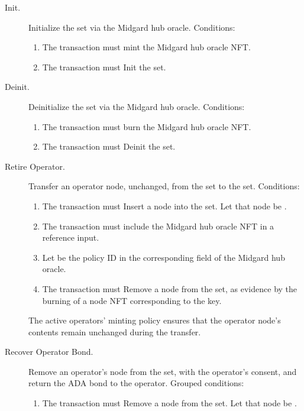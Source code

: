 \documentclass[../midgard.tex]{subfiles}
\begin{document}
\begin{description}
    \item[Init.] Initialize the  set via the Midgard hub oracle. Conditions:
        \begin{enumerate}
            \item The transaction must mint the Midgard hub oracle NFT.
            \item The transaction must Init the  set.
        \end{enumerate}
    \item[Deinit.] Deinitialize the  set via the Midgard hub oracle. Conditions:
        \begin{enumerate}
            \item The transaction must burn the Midgard hub oracle NFT.
            \item The transaction must Deinit the  set.
        \end{enumerate}
    \item[Retire Operator.] Transfer an operator node, unchanged, from the  set to the  set. Conditions:
        \begin{enumerate}
            \item The transaction must Insert a node into the  set. Let that node be .
            \item The transaction must include the Midgard hub oracle NFT in a reference input.
            \item Let  be the policy ID in the corresponding field of the Midgard hub oracle.
            \item The transaction must Remove a node from the  set, as evidence by the burning of a  node NFT corresponding to the  key.
        \end{enumerate}
        The active operators' minting policy ensures that the operator node's contents remain unchanged during the transfer.
    \item[Recover Operator Bond.] Remove an operator's node from the  set, with the operator's consent, and return the ADA bond to the operator. Grouped conditions:
        \begin{enumerate}
            \item The transaction must Remove a node from the  set. Let that node be .

\end{enumerate}
\end{description}
\end{document}
